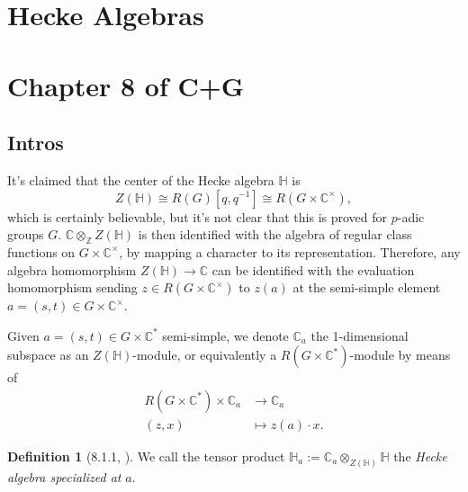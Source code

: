 \documentclass{memoir}
\newcommand{\mb}{\mathbb}
\newcommand{\bc}{\mathbb{C}}
\newcommand{\bz}{\mathbb{Z}}
\newcommand{\ten}{\otimes}
\theoremstyle{definition}
\newtheorem{definition}[theorem]{Definition}
\begin{document}
	
	
	
	
	
	
	
	
	
	
	
	
	
	
	
	
	
	
	\section{Hecke Algebras}
	
	
	
	
	
	
	
	
	
	
	







	\section{Chapter 8 of C+G}
	
	
	
	\subsection{Intros}
	
	It's claimed that the center of the Hecke algebra $\mb{H}$ is 
	$$Z(\mb{H})\cong R(G)[q, q^{-1}]\cong R(G\times\bc^\times),$$
	which is certainly believable, but it's not clear that this is proved for $p$-adic groups $G$.  
	$\bc\ten_{\bz}Z(\mb{H})$ is then identified with the algebra of regular class functions on $G\times\bc^\times$, by mapping a character to its representation.  
	Therefore, any algebra homomorphism $Z(\mb{H})\to\bc$ can be identified with the evaluation homomorphism sending $z\in R(G\times\bc^\times)$ to $z(a)$ at the semi-simple element $a=(s, t)\in G\times\bc^\times$.  
	
	Given $a=(s, t)\in G\times\bc^\ast$ semi-simple, we denote $\bc_a$ the 1-dimensional subspace as an $Z(\mb{H})$-module, or equivalently a $R(G\times\bc^\ast)$-module by means of 
	\begin{align*}
		R(G\times\bc^\ast)\times\bc_a&\to\bc_a\\
		(z, x)&\mapsto z(a)\cdot x. 
	\end{align*}
	
	\begin{definition}[8.1.1, \cite{Chr}]
		We call the tensor product $\mb{H}_a:=\bc_a\ten_{Z(\mb{H})}\mb{H}$ the \emph{Hecke algebra specialized at } $a$. 
	\end{definition}
\end{document}
